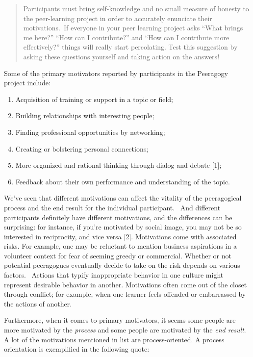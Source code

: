 \begin{quote}
Participants must bring self-knowledge and no small measure of honesty
to the peer-learning project in order to accurately enunciate their
motivations.~If everyone in your peer learning project asks ``What
brings me here?'' ``How can I contribute?'' and ``How can I contribute
more effectively?'' things will really start percolating. Test this
suggestion by asking these questions yourself and taking action on the
answers!
\end{quote}

Some of the primary motivators reported by participants in the
Peeragogy project include:

\begin{enumerate}
\itemsep1pt\parskip0pt
\item
  Acquisition of training or support in a topic or field;
\item
  Building relationships with interesting people;
\item
  Finding professional opportunities by networking;
\item
  Creating or bolstering personal connections;
\item
  More organized and rational thinking through dialog and debate {[}1{]};
\item
  Feedback about their own performance and understanding of the topic.
\end{enumerate}

We've seen that different motivations can affect the vitality of the
peeragogical process and the end result for the individual participant.~
And different participants definitely have different motivations, and
the differences can be surprising: for instance, if you're motivated by
social image, you may not be so interested in reciprocity, and vice
versa {[}2{]}. Motivations come with associated risks. For example, one
may be reluctant to mention business aspirations in a volunteer context
for fear of seeming greedy or commercial.  Whether or not potential
peeragogues eventually decide to take on the risk depends on various
factors.~ Actions that typify inappropriate behavior in one culture
might represent desirable behavior in another. Motivations often come
out of the closet through conflict; for example, when one learner feels
offended or embarrassed by the actions of another.

Furthermore, when it comes to primary motivators, it seems some people
are more motivated by the \emph{process} and some people are motivated
by the \emph{end result}.  A lot of the motivations mentioned in list
are process-oriented.  A process orientation is exemplified in the
following quote:

